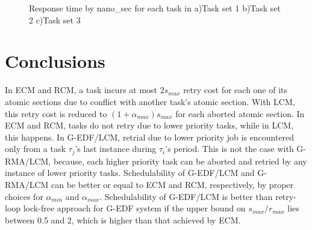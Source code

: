 \documentclass[conference]{sig-alternate}
\begin{document}
\begin{figure}[htbp]

\caption{\label{fig:res_results-1}Response time by nano\_sec for each task
in a)Task set 1 b)Task set 2 c)Task set 3}

\end{figure}

\section{Conclusions}
\label{sec:conclusions}

In ECM and RCM, a task incurs at most $2s_{max}$ retry cost for each one of its atomic sections due to conflict
with another task's atomic section. With LCM, this retry cost is reduced to $(1+\alpha_{max})s_{max}$ for each aborted atomic section. In ECM and RCM, tasks do not retry due to lower priority tasks, while in LCM, this happens. In G-EDF/LCM, retrial due to lower priority job is encountered only from a task $\tau_{j}$'s last instance during $\tau_{i}$'s period. This is not the case with G-RMA/LCM, because,  each higher priority task can be aborted and retried by any instance of lower priority tasks. Schedulability of G-EDF/LCM and G-RMA/LCM can be better or equal to ECM and RCM, respectively, by proper choices for $\alpha_{min}$ and $\alpha_{max}$. Schedulability of G-EDF/LCM is better than retry-loop lock-free approach for G-EDF system if the upper bound on $s_{max}/r_{max}$ lies between 0.5 and 2, which is higher than that achieved by ECM.
\end{document}
